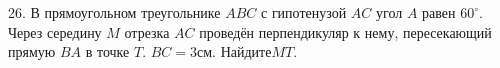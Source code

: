26. В прямоугольном треугольнике $ABC$ с гипотенузой $AC$ угол $A$ равен $60^\circ.$ Через середину $M$ отрезка $AC$ проведён перпендикуляр к нему, пересекающий прямую $BA$ в точке $T.$ $BC=3\text{см}.$ Найдите$MT.$\\
